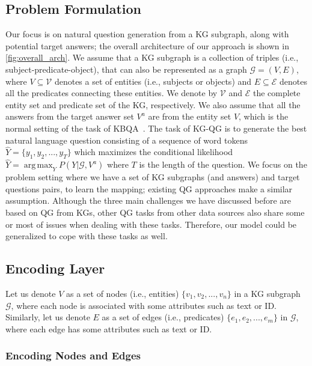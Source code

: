 \documentclass[journal]{IEEEtran}
\DeclareMathOperator*{\argmax}{arg\,max}
\begin{document}
\subsection{Problem Formulation}

Our focus is on natural question generation from a KG subgraph, along with potential target answers; the overall architecture of our approach is shown in \cref{fig:overall_arch}. 
We assume that a KG subgraph is a collection of triples (i.e., subject-predicate-object), that can also be represented as a graph $\mathcal{G}=(V, E)$,
where $V \subseteq \mathcal{V}$ denotes a set of entities (i.e., subjects or objects) 
and $E \subseteq \mathcal{E}$ denotes all the predicates connecting these entities.
We denote by $\mathcal{V}$ and $\mathcal{E}$ the complete entity set and predicate set of the KG, respectively.
We also assume that all the answers from the target answer set $V^a$ are from the entity set $V$, which is the normal setting of the task of KBQA~\cite{chen2019bidirectional}.
The task of KG-QG is to generate the best natural language question consisting of a sequence of word tokens $\hat{Y}=\{y_1, y_2, ..., y_T\}$ which maximizes the conditional likelihood
$\hat{Y} = \argmax_Y P(Y|\mathcal{G}, V^a)$ where
$T$ is the length of the question.
We focus on the problem setting where we have a set of KG subgraphs (and answers) and target questions pairs, to learn the mapping; existing QG approaches \cite{serban2016generating,elsahar2018zero,kumar2019difficulty} make a similar assumption. 
Although the three main challenges we have discussed before are based on QG from KGs, other QG tasks from other data sources also share some or most of issues when dealing with these tasks. Therefore, our model could be generalized to cope with these tasks as well.


\subsection{Encoding Layer}

Let us denote $V$ as a set of nodes (i.e., entities) $\{v_1, v_2, ..., v_n\}$ in a KG subgraph $\mathcal{G}$, where each node is associated with some attributes such as text or ID.
Similarly, let us denote $E$ as a set of edges (i.e., predicates) $\{e_1, e_2, ..., e_m\}$ in $\mathcal{G}$, where each edge has some attributes such as text or ID.



\subsubsection{Encoding Nodes and Edges}
\end{document}
